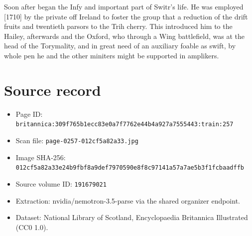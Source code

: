 \documentclass{article}
\begin{document}
Soon after began the Infy and important part of Switr’s life. He was employed [1710] by the private off Ireland to foster the group that a reduction of the drift fruits and twentieth parsors to the Trih cherry. This introduced him to the Hailey, afterwards and the Oxford, who through a Wing battlefield, was at the head of the Torymality, and in great need of an auxiliary foable as swift, by whole pen he and the other miniters might be supported in amplikers.

\section*{Source record}
\begin{itemize}
\item Page ID: \texttt{britannica:309f765b1ecc83e0a7f7762e44b4a927a7555443:train:257}
\item Scan file: \texttt{page-0257-012cf5a82a33.jpg}
\item Image SHA-256: \texttt{012cf5a82a33e24b9fbf8a9def7970590e8f8c97141a57a7ae5b3f1fcbaadffb}
\item Source volume ID: \texttt{191679021}
\item Extraction: nvidia/nemotron-3.5-parse via the shared organizer endpoint.
\item Dataset: National Library of Scotland, Encyclopaedia Britannica Illustrated (CC0 1.0).
\end{itemize}
\end{document}
